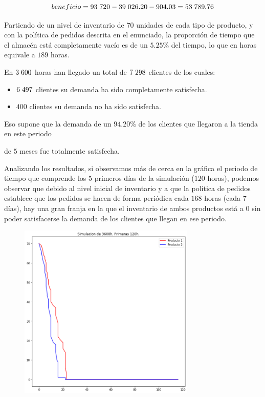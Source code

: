 \documentclass[a4paper,12pt]{article}
\begin{document}
	$$beneficio = 93\hspace{1mm}720 - 39\hspace{1mm}026.20 - 904.03 = 53\hspace{1mm}789.76$$
	
	
	Partiendo de un nivel de inventario de $70$ unidades de cada tipo de producto, y con la política de
pedidos descrita en el enunciado, la proporción de tiempo que el almacén está completamente
vacío es de un $5.25\%$ del tiempo, lo que en horas equivale a $189$ horas.

	
	En $3\hspace{1mm}600$ horas han llegado un total de $7\hspace{1mm}298$ clientes de los cuales:
	
	\begin{itemize}
		\item $6\hspace{1mm}497$ clientes su demanda ha sido completamente satisfecha.
		\item $400$ clientes su demanda no ha sido satisfecha.
	\end{itemize}

	Eso supone que la demanda de un $94.20\%$ de los clientes que llegaron a la tienda en este periodo

	de $5$ meses fue totalmente satisfecha.
	
	Analizando los resultados, si observamos más de cerca en la gráfica el periodo de tiempo que
comprende los $5$ primeros días de la simulación ($120$ horas), podemos observar que debido al
nivel inicial de inventario y a que la política de pedidos establece que los pedidos se hacen de
forma periódica cada $168$ horas (cada $7$ días), hay una gran franja en la que el inventario de ambos
productos está a $0$ sin poder satisfacerse la demanda de los clientes que llegan en ese periodo.
	
	\begin{figure}[H]
		\centering
		\includegraphics[width=0.75\textwidth]{include/simulacion/simulacion_120h.png}
	\end{figure}
	
\end{document}
